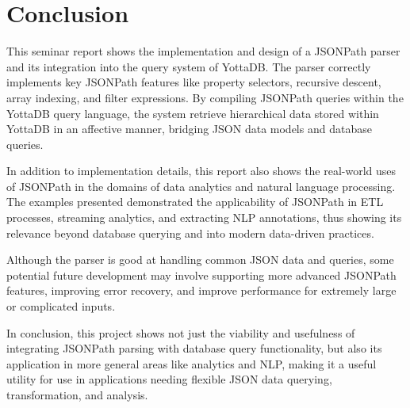 \chapter{Conclusion}
This seminar report shows the implementation and design of a JSONPath parser and its integration into the query system of YottaDB. The parser correctly implements key JSONPath features like property selectors, recursive descent, array indexing, and filter expressions.
By compiling JSONPath queries within the YottaDB query language, the system retrieve hierarchical data stored within YottaDB in an affective manner, bridging JSON data models and database queries.

In addition to implementation details, this report also shows the real-world uses of JSONPath in the domains of data analytics and natural language processing. The examples presented demonstrated the applicability of JSONPath in ETL processes, streaming analytics, and extracting NLP annotations, thus showing its relevance beyond database querying and into modern data-driven practices.

Although the parser is good at handling common JSON data and queries, some potential future development may involve supporting more advanced JSONPath features, improving error recovery, and improve performance for extremely large or complicated inputs.

In conclusion, this project shows not just the viability and usefulness of integrating JSONPath parsing with database query functionality, but also its application in more general areas like analytics and NLP, making it a useful utility for use in applications needing flexible JSON data querying, transformation, and analysis.